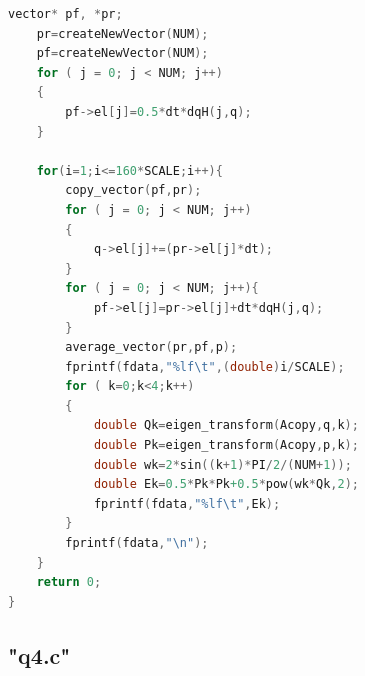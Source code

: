 \documentclass[10pt, a4paper]{article}
\begin{document}
\begin{lstlisting}[language=C]
    vector* pf, *pr;
    pr=createNewVector(NUM);
    pf=createNewVector(NUM);
    for ( j = 0; j < NUM; j++)
    {
        pf->el[j]=0.5*dt*dqH(j,q);
    }
    
    for(i=1;i<=160*SCALE;i++){
        copy_vector(pf,pr);
        for ( j = 0; j < NUM; j++)
        {
            q->el[j]+=(pr->el[j]*dt);
        }
        for ( j = 0; j < NUM; j++){
            pf->el[j]=pr->el[j]+dt*dqH(j,q);
        }
        average_vector(pr,pf,p);
        fprintf(fdata,"%lf\t",(double)i/SCALE);
        for ( k=0;k<4;k++)
        {
            double Qk=eigen_transform(Acopy,q,k);
            double Pk=eigen_transform(Acopy,p,k);
            double wk=2*sin((k+1)*PI/2/(NUM+1));
            double Ek=0.5*Pk*Pk+0.5*pow(wk*Qk,2);
            fprintf(fdata,"%lf\t",Ek);
        }
        fprintf(fdata,"\n");
    }
    return 0;
}

    \end{lstlisting}


    \subsection{"q4.c"}
\end{document}
